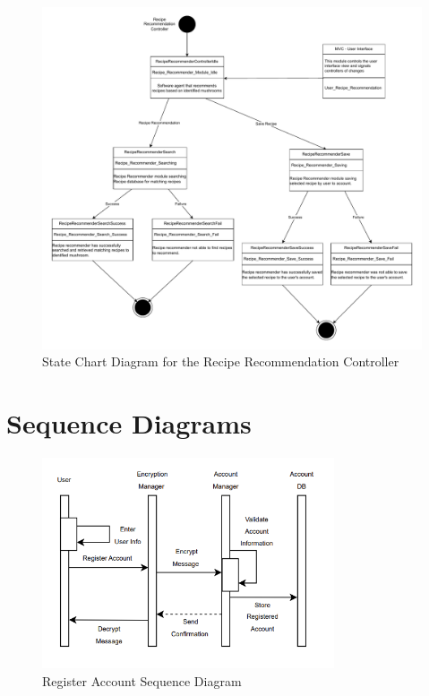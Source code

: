 \documentclass[]{article}
\begin{document}
\begin{figure}[H]
    \centering
    \includegraphics[width=\textwidth]{SE3A04_D3_Diagram_Omar-Page-2.drawio.pdf}
    \caption{State Chart Diagram for the Recipe Recommendation Controller}
\end{figure}


\newpage

\section{Sequence Diagrams}
\label{sec:sequence_diagrams}

\begin{figure}[H]
    \centering
    \includegraphics[width=0.77\textwidth]{RegisterSequenceDiagram.png}
    \caption{Register Account Sequence Diagram}
    \label{fig:register}
\end{figure}
\end{document}
